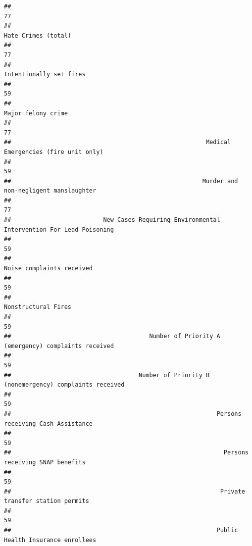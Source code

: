 \documentclass[]{article}
\begin{document}
\begin{verbatim}
##                                                                                         77 
##                                                                        Hate Crimes (total) 
##                                                                                         77 
##                                                                    Intentionally set fires 
##                                                                                         59 
##                                                                         Major felony crime 
##                                                                                         77 
##                                                       Medical Emergencies (fire unit only) 
##                                                                                         59 
##                                                      Murder and non-negligent manslaughter 
##                                                                                         77 
##                          New Cases Requiring Environmental Intervention For Lead Poisoning 
##                                                                                         59 
##                                                                  Noise complaints received 
##                                                                                         59 
##                                                                        Nonstructural Fires 
##                                                                                         59 
##                                       Number of Priority A (emergency) complaints received 
##                                                                                         59 
##                                    Number of Priority B (nonemergency) complaints received 
##                                                                                         59 
##                                                          Persons receiving Cash Assistance 
##                                                                                         59 
##                                                            Persons receiving SNAP benefits 
##                                                                                         59 
##                                                           Private transfer station permits 
##                                                                                         59 
##                                                          Public Health Insurance enrollees 

\end{verbatim}
\end{document}
